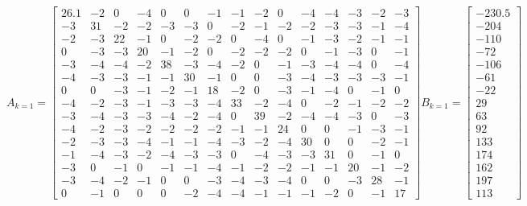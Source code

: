 \documentclass[a4paper, 12pt]{article}
\begin{document}
\[
A_{k = 1} = 
\left[{
	\begin{array}{rrrrrrrrrrrrrrr}
	26.1 & -2 & 0 & -4 & 0 & 0 & -1 & -1 & -2 & 0 & -4 & -4 & -3 & -2 & -3 \\
	-3 & 31 & -2 & -2 & -3 & -3 & 0 & -2 & -1 & -2 & -2 & -3 & -3 & -1 & -4 \\
	-2 & -3 & 22 & -1 & 0 & -2 & -2 & 0 & -4 & 0 & -1 & -3 & -2 & -1 & -1 \\
	0 & -3 & -3 & 20 & -1 & -2 & 0 & -2 & -2 & -2 & 0 & -1 & -3 & 0 & -1 \\
	-3 & -4 & -4 & -2 & 38 & -3 & -4 & -2 & 0 & -1 & -3 & -4 & -4 & 0 & -4 \\
	-4 & -3 & -3 & -1 & -1 & 30 & -1 & 0 & 0 & -3 & -4 & -3 & -3 & -3 & -1	\\
	0 & 0 & -3 & -1 & -2 & -1 & 18 & -2 & 0 & -3 & -1 & -4 & 0 & -1 & 0 \\
	-4 & -2 & -3 & -1 & -3 & -3 & -4 & 33 & -2 & -4 & 0 & -2 & -1 & -2 & -2 \\
	-3 & -4 & -3 & -3 & -4 & -2 & -4 & 0 & 39 & -2 & -4 & -4 & -3 & 0 & -3 \\
	-4 & -2 & -3 & -2 & -2 & -2 & -2 & -1 & -1 & 24 & 0 & 0 & -1 & -3 & -1 \\
	-2 & -3 & -3 & -4 & -1 & -1 & -4 & -3 & -2 & -4 & 30 & 0 & 0 & -2 & -1 \\
	-1 & -4 & -3 & -2 & -4 & -3 & -3 & 0 & -4 & -3 & -3 & 31 & 0 & -1 & 0 \\
	-3 & 0 & -1 & 0 & -1 & -1 & -4 & -1 & -2 & -2 & -1 & -1 & 20 & -1 & -2 \\
	-3 & -4 & -2 & -1 & 0 & 0 & -3 & -4 & -3 & -4 & 0 & 0 & -3 & 28 & -1 \\
	0 & -1 & 0 & 0 & 0 & -2 & -4 & -4 & -1 & -1 & -1 & -2 & 0 & -1 & 17
	\end{array} 
}\right]
B_{k = 1} = 
\left[{
	\begin{array}{r}
	-230.5 \\
	-204 \\
	-110 \\
	-72 \\
	-106 \\
	-61 \\
	-22 \\
	29 \\
	63 \\
	92 \\
	133 \\
	174 \\
	162 \\
	197 \\
	113
	\end{array}
}\right]
\]
\end{document}
